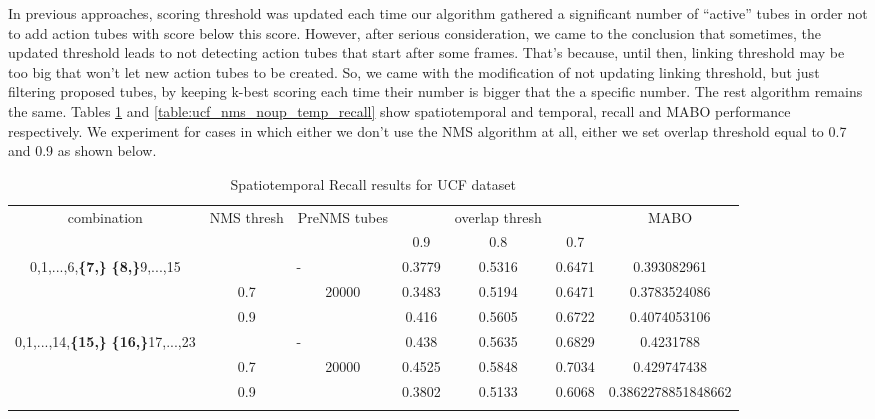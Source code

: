 In previous approaches, scoring threshold was updated each time our algorithm gathered a significant number of ``active'' tubes in order not
to add action tubes with score below this score. However, after serious consideration, we came to the conclusion that sometimes, the updated
threshold leads to not detecting action tubes that start after some frames. That's because, until then, linking threshold may be too big that
won't let new action tubes to be created. So, we came with the modification of not updating linking threshold, but just filtering proposed
tubes, by keeping k-best scoring each time their number is bigger that the a specific number. The rest algorithm remains the same. Tables
\ref{table:ucf_nms_noup_recall} and \ref{table:ucf_nms_noup_temp_recall} show spatiotemporal and temporal, recall and MABO performance respectively.
We experiment for cases in which either we don't use the  NMS algorithm at all, either we set overlap threshold equal to 0.7 and 0.9 as shown
below.

\begin{center}
  \setlength{\tabcolsep}{2pt}
\begin{longtable}{||c | c | c | c c c| c|}

  \hline
  \multirow{2}{*}{combination} & \multirow{2}{2.5em}{NMS thresh} & \multirow{2}{3.5em}{PreNMS tubes} &  {} &overlap thresh & {} & \multirow{2}{*}{MABO} \\
  {} & {} & {} &  0.9 &  0.8 & 0.7 & {}\\         
  \hline
  \multirow{3}{7em}{0,1,...,6,\textbf{\{7,\}}
  \textbf{\{8,\}}9,...,15 }   &   \multicolumn{2}{|c|}{-}     &  0.3779 & 0.5316 & 0.6471 & 0.393082961 \\
  \cline{2-7}
  {} & 0.7 &\multirow{2}{*}{20000}  & 0.3483  & 0.5194 & 0.6471 & 0.3783524086 \\
  \cline{2-2} \cline{4-7} 
  {} &  0.9   & {}   & 0.416 & 0.5605 & 0.6722 & 0.4074053106 \\
  \hline                                    
  \multirow{3}{7em}{0,1,...,14,\textbf{\{15,\}}
  \textbf{\{16,\}}17,...,23 }  &   \multicolumn{2}{|c|}{-} & 0.438 & 0.5635 & 0.6829 & 0.4231788 \\
  \cline{2-7}
  {} & 0.7 & \multirow{2}{*}{20000}   & 0.4525 & 0.5848 & 0.7034 & 0.429747438 \\
  \cline{2-2} \cline{4-7} 
  {} &  0.9   & {}   & 0.3802 & 0.5133 & 0.6068 & 0.3862278851848662 \\

  \hline                                    

  \caption{Spatiotemporal Recall results for UCF dataset}
  \label{table:ucf_nms_noup_recall}
\end{longtable} 
\end{center}

